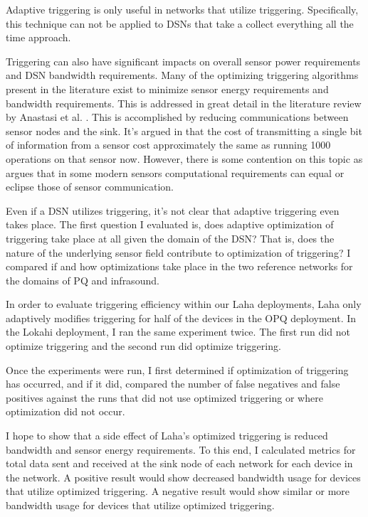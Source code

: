 Adaptive triggering is only useful in networks that utilize triggering. Specifically, this technique can not be applied to DSNs that take a collect everything all the time approach.

Triggering can also have significant impacts on overall sensor power requirements and DSN bandwidth requirements. Many of the optimizing triggering algorithms present in the literature exist to minimize sensor energy requirements and bandwidth requirements. This is addressed in great detail in the literature review by Anastasi et al. \cite{anastasi_energy_2009}. This is accomplished by reducing communications between sensor nodes and the sink. It's argued in \cite{pottie2000wireless} that the cost of transmitting a single bit of information from a sensor cost approximately the same as running 1000 operations on that sensor now. However, there is some contention on this topic as \cite{alippi_adaptive_2010} argues that in some modern sensors computational requirements can equal or eclipse those of  sensor communication.

Even if a DSN utilizes triggering, it's not clear that adaptive triggering even takes place. The first question I evaluated is, does adaptive optimization of triggering take place at all given the domain of the DSN? That is, does the nature of the underlying sensor field contribute to optimization of triggering? I compared if and how optimizations take place in the two reference networks for the domains of PQ and infrasound.

In order to evaluate triggering efficiency within our Laha deployments, Laha only adaptively modifies triggering for half of the devices in the OPQ deployment. In the Lokahi deployment, I  ran the same experiment twice. The first run did not optimize triggering and the second run did optimize triggering.

Once the experiments were run, I first determined if optimization of triggering has occurred, and if it did, compared the number of false negatives and false positives against the runs that did not use optimized triggering or where optimization did not occur.

I hope to show that a side effect of Laha's optimized triggering is reduced bandwidth and sensor energy requirements. To this end, I calculated metrics for total data sent and received at the sink node of each network for each device in the network. A positive result would show decreased bandwidth usage for devices that utilize optimized triggering. A negative result would show similar or more bandwidth usage for devices that utilize optimized triggering.

